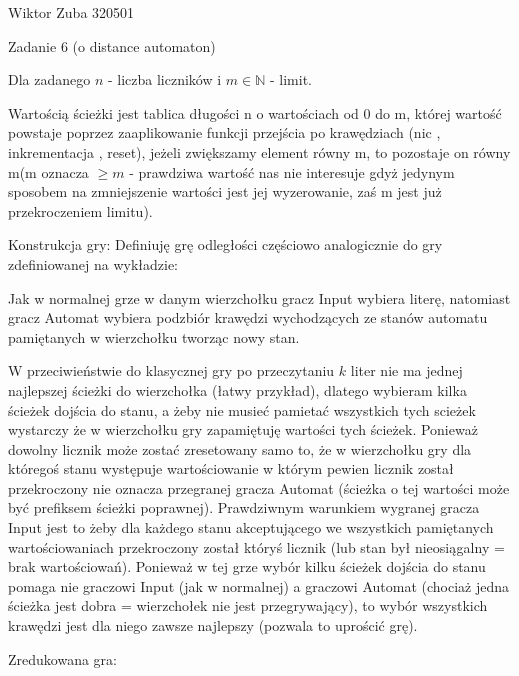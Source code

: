 \documentclass{article}
\begin{document}
Wiktor Zuba 320501\newline

Zadanie 6 (o distance automaton)\newline

Dla zadanego $n$ - liczba liczników i $m\in\mathbb{N}$ - limit.\newline

Wartością ścieżki jest tablica długości n o wartościach od 0 do m, której wartość powstaje poprzez
zaaplikowanie funkcji przejścia po krawędziach (nic , inkrementacja , reset), jeżeli zwiększamy element równy m,
to pozostaje on równy m(m oznacza $\ge m$ -
prawdziwa wartość nas nie interesuje gdyż jedynym sposobem na zmniejszenie wartości jest jej wyzerowanie, zaś m jest już przekroczeniem limitu).\newline

Konstrukcja gry:\newline
Definiuję grę odległości częściowo analogicznie do gry zdefiniowanej na wykładzie:\newline

Jak w normalnej grze w danym wierzchołku gracz Input wybiera literę, natomiast gracz Automat wybiera podzbiór krawędzi wychodzących
ze stanów automatu pamiętanych w wierzchołku tworząc nowy stan.\newline

W przeciwieństwie do klasycznej gry po przeczytaniu $k$ liter nie
ma jednej najlepszej ścieżki do wierzchołka (łatwy przykład), dlatego wybieram kilka ścieżek dojścia do stanu,
a żeby nie musieć pamietać wszystkich tych scieżek wystarczy że w wierzchołku gry zapamiętuję wartości tych ścieżek.
Ponieważ dowolny licznik może zostać zresetowany samo to, że w wierzchołku gry dla któregoś stanu występuje wartościowanie w
którym pewien licznik został przekroczony nie oznacza przegranej gracza Automat (ścieżka o tej wartości może być prefiksem ścieżki poprawnej).
Prawdziwnym warunkiem wygranej gracza Input jest to żeby dla każdego stanu akceptującego we wszystkich pamiętanych wartościowaniach
przekroczony został któryś licznik (lub stan był nieosiągalny = brak wartościowań).
Ponieważ w tej grze wybór kilku ścieżek dojścia do stanu pomaga nie graczowi Input (jak w normalnej) a graczowi Automat
(chociaż jedna ścieżka jest dobra = wierzchołek nie jest przegrywający), to wybór wszystkich krawędzi jest dla niego zawsze najlepszy
(pozwala to uprościć grę).\newline

Zredukowana gra:\newline
\end{document}

